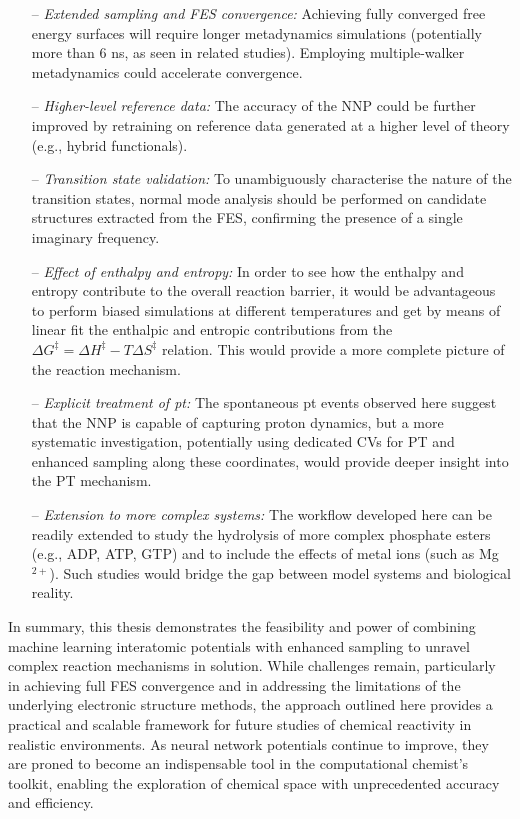 \begin{itemize}
    \item[--] \textit{Extended sampling and FES convergence:} Achieving fully converged free energy surfaces will require longer metadynamics simulations (potentially more than 6 ns, as seen in related studies). Employing multiple-walker metadynamics could accelerate convergence.
    
    \item[--] \textit{Higher-level reference data:} The accuracy of the NNP could be further improved by retraining on reference data generated at a higher level of theory (e.g., hybrid functionals).
    
    \item[--] \textit{Transition state validation:} To unambiguously characterise the nature of the transition states, normal mode analysis should be performed on candidate structures extracted from the FES, confirming the presence of a single imaginary frequency.
      
    \item[--] \textit{Effect of enthalpy and entropy:} In order to see how the enthalpy and entropy contribute to the overall reaction barrier, it would be advantageous to perform biased simulations at different temperatures and get by means of linear fit the enthalpic and entropic contributions from the $\Delta G^{\ddagger} = \Delta H^{\ddagger} - T \Delta S^{\ddagger}$ relation. This would provide a more complete picture of the reaction mechanism.
   
    \item[--] \textit{Explicit treatment of \ac{pt}:} The spontaneous \ac{pt} events observed here suggest that the NNP is capable of capturing proton dynamics, but a more systematic investigation, potentially using dedicated CVs for PT and enhanced sampling along these coordinates, would provide deeper insight into the PT mechanism.
    
    \item[--] \textit{Extension to more complex systems:} The workflow developed here can be readily extended to study the hydrolysis of more complex phosphate esters (e.g., ADP, ATP, GTP) and to include the effects of metal ions (such as Mg$^{2+}$). Such studies would bridge the gap between model systems and biological reality.
\end{itemize}

In summary, this thesis demonstrates the feasibility and power of combining machine learning interatomic potentials with enhanced sampling to unravel complex reaction mechanisms in solution. While challenges remain, particularly in achieving full FES convergence and in addressing the limitations of the underlying electronic structure methods, the approach outlined here provides a practical and scalable framework for future studies of chemical reactivity in realistic environments. As neural network potentials continue to improve, they are proned to become an indispensable tool in the computational chemist's toolkit, enabling the exploration of chemical space with unprecedented accuracy and efficiency.